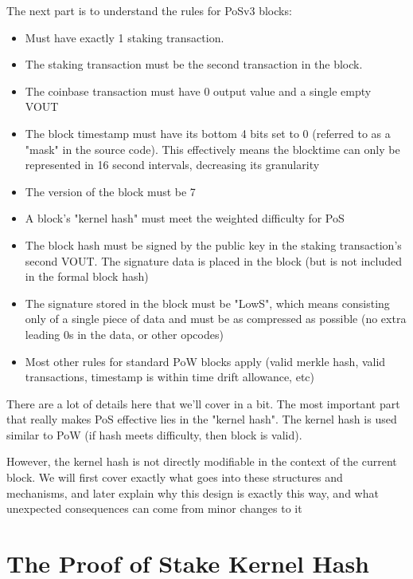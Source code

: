 The next part is to understand the rules for PoSv3 blocks:
\begin{itemize}
	\item Must have exactly 1 staking transaction.
	\item The staking transaction must be the second transaction in the block.
	\item The coinbase transaction must have 0 output value and a single empty VOUT
	\item The block timestamp must have its bottom 4 bits set to 0 (referred 
	to as a "mask" in the source code). This effectively means the blocktime 
	can only be represented in 16 second intervals, decreasing its granularity
	\item The version of the block must be 7
	\item A block's "kernel hash" must meet the weighted difficulty for PoS
	\item The block hash must be signed by the public key in the staking 
	transaction's second VOUT. The signature data is placed in the block 
	(but is not included in the formal block hash)
	\item The signature stored in the block must be "LowS", which means 
	consisting only of a single piece of data and must be as compressed 
	as possible (no extra leading 0s in the data, or other opcodes)
	\item Most other rules for standard PoW blocks apply (valid merkle 
	hash, valid transactions, timestamp is within time drift allowance, etc)
\end{itemize}



There are a lot of details here that we'll cover in a bit. The most important
part that really makes PoS effective lies in the "kernel hash". The kernel
hash is used similar to PoW (if hash meets difficulty, then block is valid).



However, the kernel hash is not directly modifiable in the context of the
current block. We will first cover exactly what goes into these structures
and mechanisms, and later explain why this design is exactly this way, and
what unexpected consequences can come from minor changes to it



\section{The Proof of Stake Kernel Hash}

